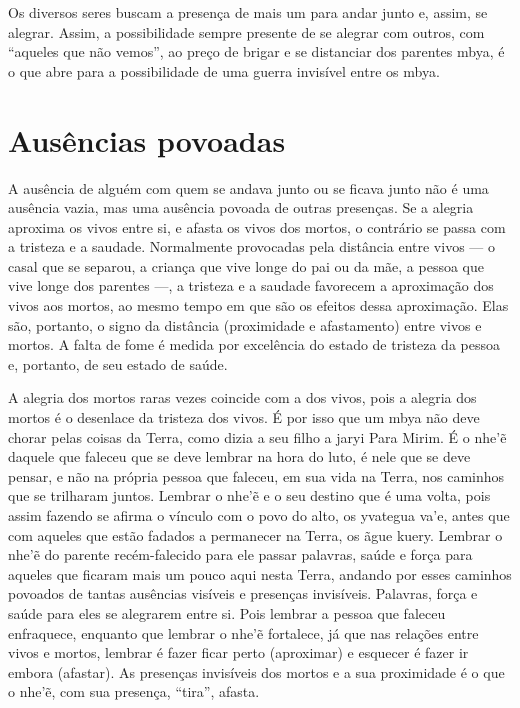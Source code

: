 Os diversos seres buscam a presença de mais um para andar junto e,
assim, se alegrar. Assim, a possibilidade sempre presente de se alegrar
com outros, com ``aqueles que não vemos'', ao preço de brigar e se
distanciar dos parentes mbya, é o que abre para a possibilidade de uma
guerra invisível entre os mbya. 

\section{Ausências povoadas}

A ausência de alguém com quem se andava junto ou se ficava junto não é
uma ausência vazia, mas uma ausência povoada de outras presenças. Se a
alegria aproxima os vivos entre si, e afasta os vivos dos mortos, o
contrário se passa com a tristeza e a saudade. Normalmente provocadas
pela distância entre vivos — o casal que se separou, a criança que vive
longe do pai ou da mãe, a pessoa que vive longe dos parentes —, a
tristeza e a saudade favorecem a aproximação dos vivos aos mortos, ao
mesmo tempo em que são os efeitos dessa aproximação. Elas são,
portanto, o signo da distância (proximidade e afastamento) entre vivos
e mortos. A falta de fome é medida por excelência do estado de tristeza
da pessoa e, portanto, de seu estado de saúde. 

A alegria dos mortos raras vezes coincide com a dos vivos, pois a
alegria dos mortos é o desenlace da tristeza dos vivos. É por isso que
um mbya não deve chorar pelas coisas da Terra, como dizia a seu filho a
jaryi Para Mirim. É o nhe’\~{e} daquele que faleceu que se deve
lembrar na hora do luto, é nele que se deve pensar, e não na própria
pessoa que faleceu, em sua vida na Terra, nos caminhos que se trilharam
juntos. Lembrar o nhe’\~{e} e o seu destino que é uma volta, pois
assim fazendo se afirma o vínculo com o povo do alto, os yvategua va’e,
antes que com aqueles que estão fadados a permanecer na Terra, os ãgue
kuery. Lembrar o nhe’\~{e} do parente recém-falecido para ele passar
palavras, saúde e força para aqueles que ficaram mais um pouco aqui
nesta Terra, andando por esses caminhos povoados de tantas ausências
visíveis e presenças invisíveis. Palavras, força e saúde para eles se
alegrarem entre si. Pois lembrar a pessoa que faleceu enfraquece,
enquanto que lembrar o nhe’\~{e} fortalece, já que nas relações entre
vivos e mortos, lembrar é fazer ficar perto (aproximar) e esquecer é
fazer ir embora (afastar). As presenças invisíveis dos mortos e a sua
proximidade é o que o nhe’\~{e}, com sua presença, ``tira'', afasta.

